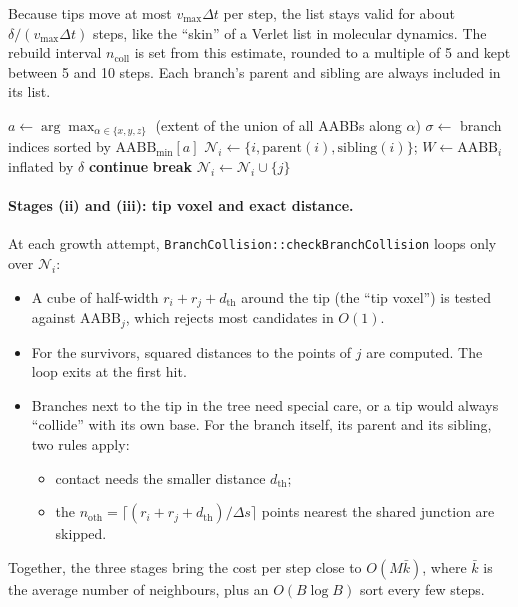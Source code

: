 \documentclass[11pt,a4paper]{article}
\newcommand{\code}[1]{\texttt{#1}}
\begin{document}
Because tips move at most $v_\text{max}\Delta t$ per step, the list stays valid for about $\delta/(v_\text{max}\Delta t)$ steps, like the ``skin'' of a Verlet list in molecular dynamics. The rebuild interval $n_\text{coll}$ is set from this estimate, rounded to a multiple of 5 and kept between 5 and 10 steps. Each branch's parent and sibling are always included in its list.

\begin{algorithm}[!htbp]
\caption{Broad phase: sort-and-sweep neighbour lists (\code{updateNeighborList})}\label{alg:neigh}
\begin{algorithmic}[1]
\State $a\gets\arg\max_{\alpha\in\{x,y,z\}}$ (extent of the union of all AABBs along $\alpha$)
\State $\sigma\gets$ branch indices sorted by $\text{AABB}_\text{min}[a]$
  \State $\mathcal N_i\gets\{i,\text{parent}(i),\text{sibling}(i)\}$; $W\gets\text{AABB}_i$ inflated by $\delta$
      \textbf{continue} \EndIf
      \textbf{break} \EndIf {}
      $\mathcal N_i\gets\mathcal N_i\cup\{j\}$ \EndIf
  \EndFor
\EndFor
\end{algorithmic}
\end{algorithm}

\paragraph{Stages (ii) and (iii): tip voxel and exact distance.}
At each growth attempt, \code{BranchCollision::\allowbreak checkBranchCollision} loops only over $\mathcal N_i$:
\begin{itemize}
  \item A cube of half-width $r_i+r_j+d_\text{th}$ around the tip (the ``tip voxel'') is tested against $\text{AABB}_j$, which rejects most candidates in $O(1)$.
  \item For the survivors, squared distances to the points of $j$ are computed. The loop exits at the first hit.
  \item Branches next to the tip in the tree need special care, or a tip would always ``collide'' with its own base. For the branch itself, its parent and its sibling, two rules apply:
  \begin{itemize}
    \item contact needs the smaller distance $d_\text{th}$;
    \item the $n_\text{oth}=\lceil(r_i+r_j+d_\text{th})/\Delta s\rceil$ points nearest the shared junction are skipped.
  \end{itemize}
\end{itemize}
Together, the three stages bring the cost per step close to $O(M\bar k)$, where $\bar k$ is the average number of neighbours, plus an $O(B\log B)$ sort every few steps.
\end{document}

